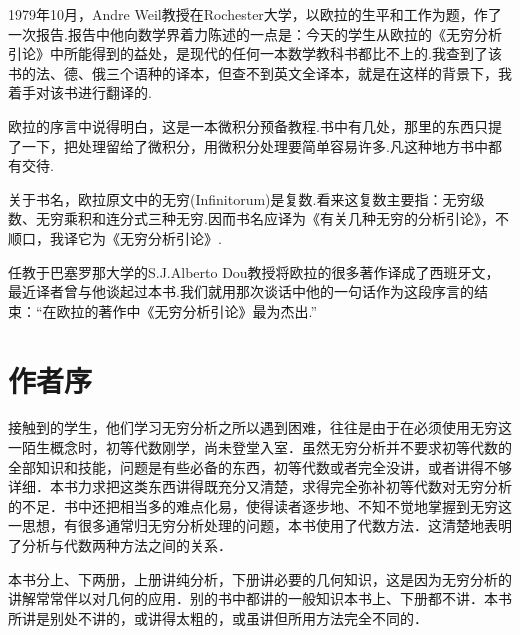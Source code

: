 1979年10月，Andre Weil教授在Rochester大学，以欧拉的生平和工作为题，作了一次报告.报告中他向数学界着力陈述的一点是：今天的学生从欧拉的《无穷分析引论》中所能得到的益处，是现代的任何一本数学教科书都比不上的.我查到了该书的法、德、俄三个语种的译本，但查不到英文全译本，就是在这样的背景下，我着手对该书进行翻译的.

欧拉的序言中说得明白，这是一本微积分预备教程.书中有几处，那里的东西只提了一下，把处理留给了微积分，用微积分处理要简单容易许多.凡这种地方书中都有交待.

关于书名，欧拉原文中的无穷(Infinitorum)是复数.看来这复数主要指：无穷级数、无穷乘积和连分式三种无穷.因而书名应译为《有关几种无穷的分析引论》，不顺口，我译它为《无穷分析引论》.

任教于巴塞罗那大学的S.J.Alberto Dou教授将欧拉的很多著作译成了西班牙文，最近译者曾与他谈起过本书.我们就用那次谈话中他的一句话作为这段序言的结束：“在欧拉的著作中《无穷分析引论》最为杰出.”

\section*{作者序}

接触到的学生，他们学习无穷分析之所以遇到困难，往往是由于在必须使用无穷这一陌生概念时，初等代数刚学，尚未登堂入室．虽然无穷分析并不要求初等代数的全部知识和技能，问题是有些必备的东西，初等代数或者完全没讲，或者讲得不够详细．本书力求把这类东西讲得既充分又清楚，求得完全弥补初等代数对无穷分析的不足．书中还把相当多的难点化易，使得读者逐步地、不知不觉地掌握到无穷这一思想，有很多通常归无穷分析处理的问题，本书使用了代数方法．这清楚地表明了分析与代数两种方法之间的关系．

本书分上、下两册，上册讲纯分析，下册讲必要的几何知识，这是因为无穷分析的讲解常常伴以对几何的应用．别的书中都讲的一般知识本书上、下册都不讲．本书所讲是别处不讲的，或讲得太粗的，或虽讲但所用方法完全不同的．

